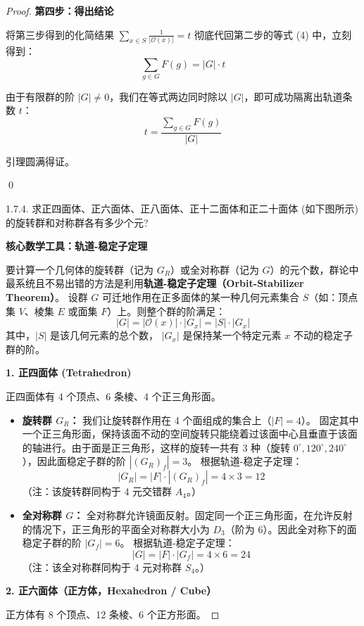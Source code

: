\documentclass[]{article}
\begin{document}
\begin{proof}
\bigskip
\noindent \textbf{第四步：得出结论}

将第三步得到的化简结果 $\sum_{x \in S} \frac{1}{|\mathcal{O}(x)|} = t$ 彻底代回第二步的等式 (4) 中，立刻得到：
\[ \sum_{g \in G} F(g) = |G| \cdot t \]

由于有限群的阶 $|G| \neq 0$，我们在等式两边同时除以 $|G|$，即可成功隔离出轨道条数 $t$：
\[ t = \frac{\sum_{g \in G} F(g)}{|G|} \]

引理圆满得证。

\qed

1.7.4. 求正四面体、正六面体、正八面体、正十二面体和正二十面体 (如下图所示) 的旋转群和对称群各有多少个元? 

\bigskip
\noindent \textbf{核心数学工具：轨道-稳定子定理}

要计算一个几何体的旋转群（记为 $G_R$）或全对称群（记为 $G$）的元个数，群论中最系统且不易出错的方法是利用\textbf{轨道-稳定子定理（Orbit-Stabilizer Theorem）}。
设群 $G$ 可迁地作用在正多面体的某一种几何元素集合 $S$（如：顶点集 $V$、棱集 $E$ 或面集 $F$）上。则整个群的阶满足：
\[ |G| = |\mathcal{O}(x)| \cdot |G_x| = |S| \cdot |G_x| \]
其中，$|S|$ 是该几何元素的总个数， $|G_x|$ 是保持某一个特定元素 $x$ 不动的稳定子群的阶。

\bigskip
\noindent \textbf{1. 正四面体 (Tetrahedron)}

正四面体有 4 个顶点、6 条棱、4 个正三角形面。

\begin{itemize}
	\item \textbf{旋转群 $G_R$：}
	我们让旋转群作用在 4 个面组成的集合上（$|F| = 4$）。
	固定其中一个正三角形面，保持该面不动的空间旋转只能绕着过该面中心且垂直于该面的轴进行。由于面是正三角形，这样的旋转一共有 3 种（旋转 $0^\circ, 120^\circ, 240^\circ$），因此面稳定子群的阶 $|(G_R)_f| = 3$。
	根据轨道-稳定子定理：
	\[ |G_R| = |F| \cdot |(G_R)_f| = 4 \times 3 = 12 \]
	（注：该旋转群同构于 4 元交错群 $A_4$。）
	
	\item \textbf{全对称群 $G$：}
	全对称群允许镜面反射。固定同一个正三角形面，在允许反射的情况下，正三角形的平面全对称群大小为 $D_3$（阶为 6）。因此全对称下的面稳定子群的阶 $|G_f| = 6$。
	根据轨道-稳定子定理：
	\[ |G| = |F| \cdot |G_f| = 4 \times 6 = 24 \]
	（注：该全对称群同构于 4 元对称群 $S_4$。）
\end{itemize}

\bigskip
\noindent \textbf{2. 正六面体（正方体，Hexahedron / Cube）}

正方体有 8 个顶点、12 条棱、6 个正方形面。


\end{proof}
\end{document}
